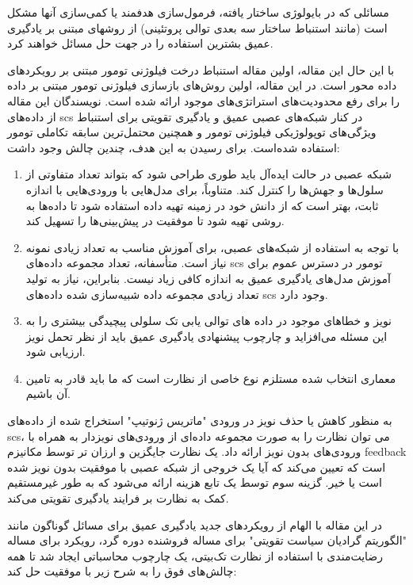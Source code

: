 مسائلی که در بایولوژی ساختار یافته، فرمول‌سازی هدفمند یا کمی‌سازی آنها مشکل است (مانند استنباط ساختار سه بعدی توالی پروتئینی) از روشهای مبتنی بر یادگیری عمیق بشترین استفاده را در جهت حل مسائل خواهند کرد. \cite{senior2020improved}

با این حال این مقاله، اولین مقاله استنباط درخت فیلوژنی تومور مبتنی بر رویکردهای داده محور است. در این مقاله، اولین روش‌های بازسازی فیلوژنی تومور مبتنی بر داده را برای رفع محدودیت‌های استراتژی‌های موجود ارائه شده است. نویسندگان این مقاله از داده‌های \gls{scs} در کنار شبکه‌های عصبی عمیق و یادگیری تقویتی برای استنباط ویژگی‌های توپولوژیکی فیلوژنی تومور و همچنین محتمل‌ترین سابقه تکاملی تومور استفاده شده‌است. برای رسیدن به  این هدف، چندین چالش وجود داشت: 


\begin{enumerate}
	\item     شبکه عصبی در حالت ایده‌آل باید طوری طراحی شود که بتواند تعداد متفاوتی از سلول‌ها و جهش‌ها را کنترل کند.  متناوباً، برای مدل‌هایی با ورودی‌هایی با اندازه ثابت‌، بهتر است که از دانش خود در زمینه تهیه داده استفاده شود تا داده‌ها به روشی تهیه شود تا موفقیت در پیش‌بینی‌ها را تسهیل کند. 
	\item با توجه به استفاده از شبکه‌های عصبی، برای آموزش مناسب به تعداد زیادی نمونه نیاز است. متأسفانه، تعداد مجموعه داده‌های \gls{scs} تومور در دسترس عموم برای آموزش مدل‌های یادگیری عمیق به اندازه کافی زیاد نیست. بنابراین، نیاز به تولید تعداد زیادی مجموعه داده شبیه‌سازی شده داده‌های \gls{scs} وجود دارد.  
	\item نویز و خطاهای موجود در داده های توالی یابی تک سلولی پیچیدگی بیشتری را به این مسئله می‌افزاید و چارچوب پیشنهادی یادگیری عمیق باید از نظر تحمل نویز  ارزیابی شود.  
	\item معماری انتخاب شده مستلزم نوع خاصی از نظارت است که ما باید قادر به تامین آن باشیم.
\end{enumerate}


به منظور کاهش یا حذف نویز در ورودی "ماتریس ژنوتیپ" استخراج شده از داده‌های \gls{scs}، می توان نظارت را به صورت مجموعه داده‌ای از ورودی‌های نویزدار به همراه با ورودی‌های بدون نویز ارائه داد. یک نظارت جایگزین و ارزان تر توسط مکانیزم \gls{feedback} است که تعیین می‌کند که آیا  یک خروجی  از شبکه عصبی با موفقیت بدون نویز شده است یا خیر. گزینه سوم توسط یک تابع هزینه ارائه می‌شود که به طور غیرمستقیم کمک به نظارت بر فرایند یادگیری تقویتی می‌کند. 

در این مقاله با الهام از رویکردهای جدید یادگیری عمیق  برای مسائل گوناگون مانند "الگوریتم گرادیان سیاست تقویتی" برای مساله فروشنده دوره گرد\cite{williams1992simple}،  رویکرد  \cite{selsam2018learning} برای مساله رضایت‌مندی با استفاده از نظارت تک‌بیتی، یک چارچوب محاسباتی ایجاد شد تا همه چالش‌های فوق را به شرح زیر با موفقیت حل کند: 




